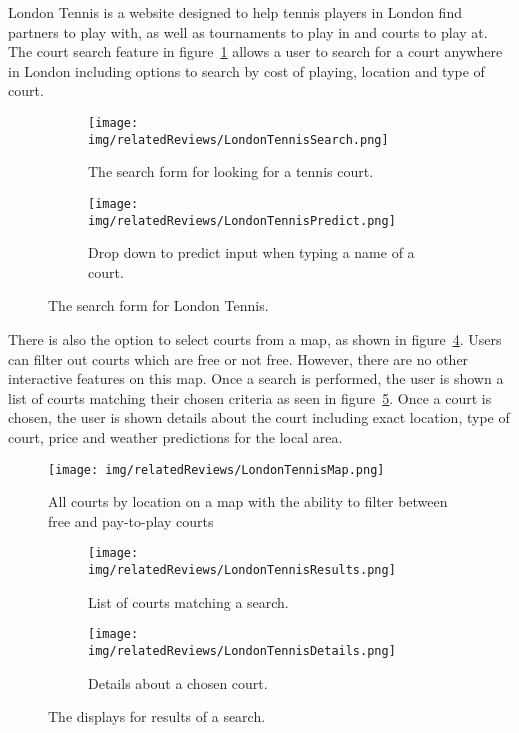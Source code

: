 London Tennis is a website designed to help tennis players in London find
partners to play with, as well as tournaments to play in and courts to play at.
The court search feature in figure~\ref{fig:LondonTennisSearch} allows a user
to search for a court anywhere in London including options to search by cost of
playing, location and type of court.
\begin{figure}[htbp]
	\centering
	\begin{subfigure}[b]{0.6\textwidth}
		\texttt{[image: img/relatedReviews/LondonTennisSearch.png]}
		\caption{The search form for looking for a tennis court.
		}\label{fig:LondonTennisSearch}
	\end{subfigure}%
	\qquad
	\begin{subfigure}[b]{0.35\textwidth}
		\texttt{[image: img/relatedReviews/LondonTennisPredict.png]}
		\caption{Drop down to predict input when typing a name of a court.
		}\label{fig:LondonTennisPredict}
	\end{subfigure}
	\qquad
	\caption{The search form for London Tennis.
	}\label{fig:LondonTennisSearchMain}
\end{figure}

There is also the option to select courts from a map, as shown in
figure~\ref{fig:LondonTennisMap}. Users can filter out courts which are free or
not free. However, there are no other interactive features on this map. Once a
search is performed, the user is shown a list of courts matching their chosen
criteria as seen in figure~\ref{fig:LondonTennisResults}. Once a court is
chosen, the user is shown details about the court including exact location,
type of court, price and weather predictions for the local area.
\begin{figure}
	\begin{center}
		\texttt{[image: img/relatedReviews/LondonTennisMap.png]}
	\end{center}
	\caption{All courts by location on a map with the ability to filter between
	free and pay-to-play courts}\label{fig:LondonTennisMap}
\end{figure}

\begin{figure}[htbp]
	\centering
	\begin{subfigure}[b]{0.7\textwidth}
		\texttt{[image: img/relatedReviews/LondonTennisResults.png]}
		\caption{List of courts matching a search.
		}\label{fig:LondonTennisResults}
	\end{subfigure}
	\begin{subfigure}[b]{0.7\textwidth}
		\texttt{[image: img/relatedReviews/LondonTennisDetails.png]}
		\caption{Details about a chosen court. }\label{fig:LondonTennisDetails}
	\end{subfigure}
	\caption{The displays for results of a search.
	}\label{fig:LondonTennisResultsMain}
\end{figure}

